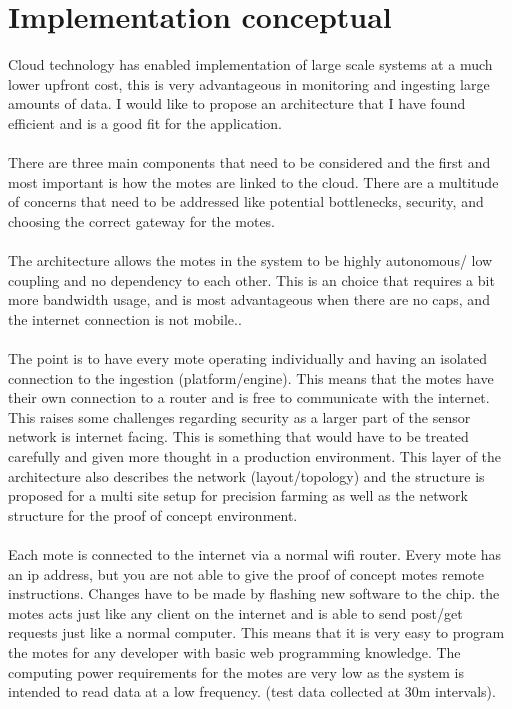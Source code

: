 \documentclass[]{uiophd}
\begin{document}
\section{Implementation conceptual}
Cloud technology has enabled implementation of large scale systems at a much lower upfront cost, this is very advantageous in monitoring and ingesting large amounts of data. I would like to propose an architecture that I have found efficient and is a good fit for the application. 
\\\\
There are three main components that need to be considered and the first and most important is how the motes are linked to the cloud. There are a multitude of concerns that need to be addressed like potential bottlenecks, security, and choosing the correct gateway for the motes.
\\\\
The architecture allows the motes in the system to be highly autonomous/ low coupling and no dependency to each other. This is an choice that requires a bit more bandwidth usage, and is most advantageous when there are no caps, and the internet connection is not mobile..
\\\\
The point is to have every mote operating individually and having an isolated connection to the ingestion (platform/engine). This means that the motes have their own connection to a router and is free to communicate with the internet. This raises some challenges regarding security as a larger part of the sensor network is internet facing. This is something that would have to be treated carefully and given more thought in a production environment. This layer of the architecture also describes the network (layout/topology) and the structure is proposed for a multi site setup for precision farming as well as the network structure for the proof of concept environment.
\\\\
Each mote is connected to the internet via a normal wifi router. Every mote has an ip address, but you are not able to give the proof of concept motes remote instructions. Changes have to be made by flashing new software to the chip. the motes acts just like any client on the internet and is able to send post/get requests just like a normal computer. This means that it is very easy to program the motes for any developer with basic web programming knowledge. The computing power requirements for the motes are very low as the system is intended to read data at a low frequency. (test data collected at 30m intervals).
\end{document}
